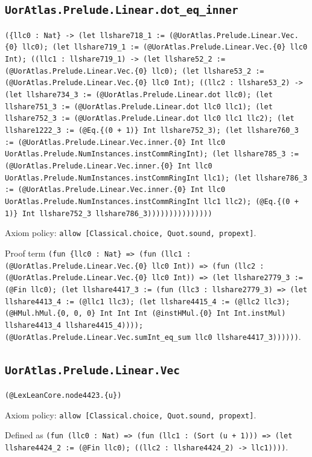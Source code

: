 \documentclass[11pt]{article}
\begin{document}
\subsection*{\texttt{UorAtlas.Prelude.Linear.dot\_eq\_inner}}
\noindent\texttt{(\{llc0 : Nat\} -> (let llshare718\_1 := (@UorAtlas.Prelude.Linear.Vec.\{0\} llc0); (let llshare719\_1 := (@UorAtlas.Prelude.Linear.Vec.\{0\} llc0 Int); ((llc1 : llshare719\_1) -> (let llshare52\_2 := (@UorAtlas.Prelude.Linear.Vec.\{0\} llc0); (let llshare53\_2 := (@UorAtlas.Prelude.Linear.Vec.\{0\} llc0 Int); ((llc2 : llshare53\_2) -> (let llshare734\_3 := (@UorAtlas.Prelude.Linear.dot llc0); (let llshare751\_3 := (@UorAtlas.Prelude.Linear.dot llc0 llc1); (let llshare752\_3 := (@UorAtlas.Prelude.Linear.dot llc0 llc1 llc2); (let llshare1222\_3 := (@Eq.\{(0 + 1)\} Int llshare752\_3); (let llshare760\_3 := (@UorAtlas.Prelude.Linear.Vec.inner.\{0\} Int llc0 UorAtlas.Prelude.NumInstances.instCommRingInt); (let llshare785\_3 := (@UorAtlas.Prelude.Linear.Vec.inner.\{0\} Int llc0 UorAtlas.Prelude.NumInstances.instCommRingInt llc1); (let llshare786\_3 := (@UorAtlas.Prelude.Linear.Vec.inner.\{0\} Int llc0 UorAtlas.Prelude.NumInstances.instCommRingInt llc1 llc2); (@Eq.\{(0 + 1)\} Int llshare752\_3 llshare786\_3)))))))))))))))}\par
\noindent Axiom policy: \texttt{allow [Classical.choice, Quot.sound, propext]}.\par
\noindent Proof term \texttt{(fun \{llc0 : Nat\} => (fun (llc1 : (@UorAtlas.Prelude.Linear.Vec.\{0\} llc0 Int)) => (fun (llc2 : (@UorAtlas.Prelude.Linear.Vec.\{0\} llc0 Int)) => (let llshare2779\_3 := (@Fin llc0); (let llshare4417\_3 := (fun (llc3 : llshare2779\_3) => (let llshare4413\_4 := (@llc1 llc3); (let llshare4415\_4 := (@llc2 llc3); (@HMul.hMul.\{0, 0, 0\} Int Int Int (@instHMul.\{0\} Int Int.instMul) llshare4413\_4 llshare4415\_4)))); (@UorAtlas.Prelude.Linear.Vec.sumInt\_eq\_sum llc0 llshare4417\_3))))))}.\par
\subsection*{\texttt{UorAtlas.Prelude.Linear.Vec}}
\noindent\texttt{(@LexLeanCore.node4423.\{u\})}\par
\noindent Axiom policy: \texttt{allow [Classical.choice, Quot.sound, propext]}.\par
\noindent Defined as \texttt{(fun (llc0 : Nat) => (fun (llc1 : (Sort (u + 1))) => (let llshare4424\_2 := (@Fin llc0); ((llc2 : llshare4424\_2) -> llc1))))}.\par
\end{document}
